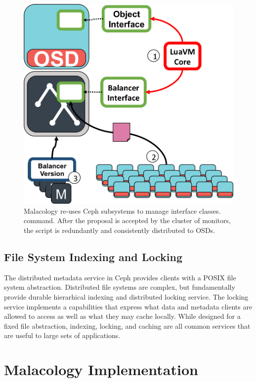 \documentclass[10pt,twocolumn]{article}
\begin{document}
\begin{figure}[htbp]
\centering
\includegraphics{figures/implementation.png}
\caption{Malacology re-uses Ceph subsystems to manage interface classes.
command. After the proposal is accepted by the cluster of monitors, the
script is redundantly and consistently distributed to OSDs.
\label{fig:implementation}}
\end{figure}

\subsection{File System Indexing and Locking}

The distributed metadata service in Ceph provides clients with a POSIX file
system abstraction. Distributed file systems are complex, but fundamentally
provide durable hierarhical indexing and distributed locking service.  The
locking service implements a capabilities that express what data and metadata
clients are allowed to access as well as what they may cache locally.  While
designed for a fixed file abstraction, indexing, locking, and caching are all
common services that are useful to large sets of applications.

\section{Malacology Implementation}
\label{implementation}
\end{document}
